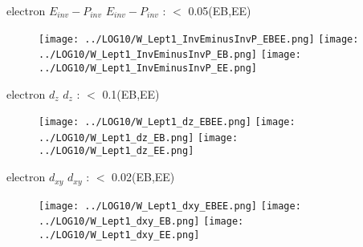 \documentclass[xcolor=x11names,compress]{beamer}
\renewcommand{\(}{\begin{columns}}
\renewcommand{\)}{\end{columns}}
\newcommand{\<}[1]{\begin{column}{#1}}
\renewcommand{\>}{\end{column}}
\begin{document}
\begin{frame}{electron $E_{inv}-P_{inv}$}
$E_{inv}-P_{inv}$ : $<$ 0.05(EB,EE)
  \begin{figure}[ht!]
    \centering
    \scalebox{0.13}
    {
      \texttt{[image: ../LOG10/W\_Lept1\_InvEminusInvP\_EBEE.png]}
      \texttt{[image: ../LOG10/W\_Lept1\_InvEminusInvP\_EB.png]}
      \texttt{[image: ../LOG10/W\_Lept1\_InvEminusInvP\_EE.png]}
    }
  \end{figure}

\end{frame}


\begin{frame}{electron $d_{z}$}
$d_{z}$ : $<$ 0.1(EB,EE)
  \begin{figure}[ht!]
    \centering
    \scalebox{0.13}
    {
      \texttt{[image: ../LOG10/W\_Lept1\_dz\_EBEE.png]}
      \texttt{[image: ../LOG10/W\_Lept1\_dz\_EB.png]}
      \texttt{[image: ../LOG10/W\_Lept1\_dz\_EE.png]}
    }
  \end{figure}

\end{frame}

\begin{frame}{electron $d_{xy}$}
$d_{xy}$ : $<$ 0.02(EB,EE)
  \begin{figure}[ht!]
    \centering
    \scalebox{0.13}
    {
      \texttt{[image: ../LOG10/W\_Lept1\_dxy\_EBEE.png]}
      \texttt{[image: ../LOG10/W\_Lept1\_dxy\_EB.png]}
      \texttt{[image: ../LOG10/W\_Lept1\_dxy\_EE.png]}
    }
  \end{figure}

\end{frame}


\end{document}
